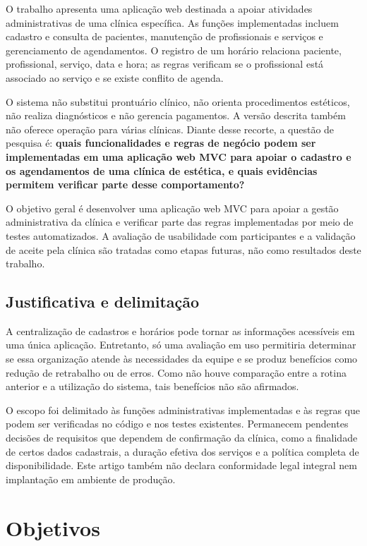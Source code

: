 \documentclass[12pt,a4paper]{article}
\begin{document}
O trabalho apresenta uma aplicação web destinada a apoiar atividades administrativas de uma clínica específica. As funções implementadas incluem cadastro e consulta de pacientes, manutenção de profissionais e serviços e gerenciamento de agendamentos. O registro de um horário relaciona paciente, profissional, serviço, data e hora; as regras verificam se o profissional está associado ao serviço e se existe conflito de agenda.

O sistema não substitui prontuário clínico, não orienta procedimentos estéticos, não realiza diagnósticos e não gerencia pagamentos. A versão descrita também não oferece operação para várias clínicas. Diante desse recorte, a questão de pesquisa é: \textbf{quais funcionalidades e regras de negócio podem ser implementadas em uma aplicação web MVC para apoiar o cadastro e os agendamentos de uma clínica de estética, e quais evidências permitem verificar parte desse comportamento?}

O objetivo geral é desenvolver uma aplicação web MVC para apoiar a gestão administrativa da clínica e verificar parte das regras implementadas por meio de testes automatizados. A avaliação de usabilidade com participantes e a validação de aceite pela clínica são tratadas como etapas futuras, não como resultados deste trabalho.

\subsection{Justificativa e delimitação}

A centralização de cadastros e horários pode tornar as informações acessíveis em uma única aplicação. Entretanto, só uma avaliação em uso permitiria determinar se essa organização atende às necessidades da equipe e se produz benefícios como redução de retrabalho ou de erros. Como não houve comparação entre a rotina anterior e a utilização do sistema, tais benefícios não são afirmados.

O escopo foi delimitado às funções administrativas implementadas e às regras que podem ser verificadas no código e nos testes existentes. Permanecem pendentes decisões de requisitos que dependem de confirmação da clínica, como a finalidade de certos dados cadastrais, a duração efetiva dos serviços e a política completa de disponibilidade. Este artigo também não declara conformidade legal integral nem implantação em ambiente de produção.

\section{Objetivos}
\end{document}
